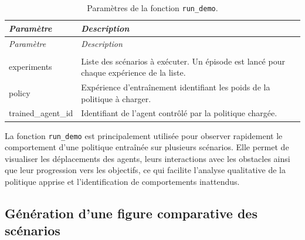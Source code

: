 \begin{longtable}{
        >{\ttfamily\small}p{}
        p{}
    }
    \caption{Paramètres de la fonction \texttt{run\_demo}.}
    \label{tab:run_demo_parameters}                                                                                            \\

    \toprule
    \textnormal{\textit{Paramètre}} & \textit{Description}                                                                     \\
    \midrule
    \endfirsthead

    \toprule
    \textnormal{\textit{Paramètre}} & \textit{Description}                                                                     \\
    \midrule
    \endhead

    \midrule
    \\
    \endfoot

    \bottomrule
    \endlastfoot

    experiments

                                    & Liste des scénarios à exécuter. Un épisode est lancé pour chaque expérience de la liste. \\

    policy

                                    & Expérience d'entraînement identifiant les poids de la politique à charger.               \\



    trained\_agent\_id

                                    & Identifiant de l'agent contrôlé par la politique chargée.                                \\
\end{longtable}

\noindent La fonction \texttt{run\_demo} est principalement utilisée pour observer rapidement le comportement d'une politique entraînée sur plusieurs scénarios. Elle permet de visualiser les déplacements des agents, leurs interactions avec les obstacles ainsi que leur progression vers les objectifs, ce qui facilite l'analyse qualitative de la politique apprise et l'identification de comportements inattendus.

\subsection{Génération d'une figure comparative des scénarios}

